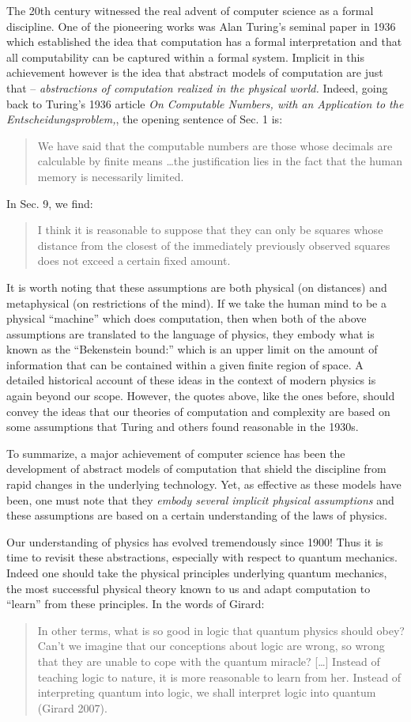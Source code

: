 \documentclass{article}
\begin{document}
The 20th century witnessed the real advent of computer science as a
formal discipline. One of the pioneering works was Alan Turing's
seminal paper in 1936 which established the idea that computation has
a formal interpretation and that all computability can be captured
within a formal system. Implicit in this achievement however is the
idea that abstract models of computation are just that --
\emph{abstractions of computation realized in the physical world.}
Indeed, going back to Turing's 1936 article \emph{On Computable
  Numbers, with an Application to the Entscheidungsproblem,}, the
opening sentence of Sec. 1 is:
\begin{quote}
  We have said that the computable numbers are those whose decimals are
  calculable by finite means \ldots the justification lies in the fact that
  the human memory is necessarily limited.
\end{quote}
In Sec. 9, we find:
\begin{quote}
  I think it is reasonable to suppose that they can only be squares
  whose distance from the closest of the immediately previously
  observed squares does not exceed a certain fixed amount.
\end{quote}
It is worth noting that these assumptions are both physical (on
distances) and metaphysical (on restrictions of the mind).  If we take
the human mind to be a physical ``machine'' which does computation,
then when both of the above assumptions are translated to the language
of physics, they embody what is known as the ``Bekenstein bound:''
which is an upper limit on the amount of information that can be
contained within a given finite region of space. A detailed historical
account of these ideas in the context of modern physics is again
beyond our scope. However, the quotes above, like the ones before,
should convey the ideas that our theories of computation and
complexity are based on some assumptions that Turing and others found
reasonable in the 1930s.

To summarize, a major achievement of computer science has been the
development of abstract models of computation that shield the
discipline from rapid changes in the underlying technology. Yet, as
effective as these models have been, one must note that they
\emph{embody several implicit physical assumptions} and these
assumptions are based on a certain understanding of the laws of
physics. 

Our understanding of physics has evolved tremendously since 1900!
Thus it is time to revisit these abstractions, especially with respect
to quantum mechanics.  Indeed one should take the physical principles
underlying quantum mechanics, the most successful physical theory
known to us and adapt computation to ``learn'' from these principles.
In the words of Girard:
\begin{quote}
  In other terms, what is so good in logic that quantum physics should
  obey?  Can't we imagine that our conceptions about logic are wrong,
  so wrong that they are unable to cope with the quantum miracle?
  [\ldots] Instead of teaching logic to nature, it is more reasonable
  to learn from her. Instead of interpreting quantum into logic, we
  shall interpret logic into quantum (Girard 2007).
\end{quote}
\end{document}
